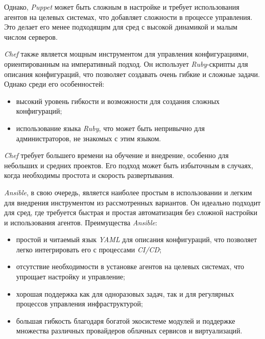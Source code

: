 Однако, \textit{Puppet} может быть сложным в настройке и требует использования агентов на целевых системах, что добавляет сложности в процессе управления. Это делает его менее подходящим для сред с высокой динамикой и малым числом серверов.


\textit{Chef} также является мощным инструментом для управления конфигурациями, ориентированным на императивный подход. Он использует \textit{Ruby}-скрипты для описания конфигураций, что позволяет создавать очень гибкие и сложные задачи. Однако среди его особенностей:
\begin{itemize}
    \item высокий уровень гибкости и возможности для создания сложных конфигураций;
    \item использование языка \textit{Ruby}, что может быть непривычно для администраторов, не знакомых с этим языком.
\end{itemize}

\textit{Chef} требует большего времени на обучение и внедрение, особенно для небольших и средних проектов. Его подход может быть избыточным в случаях, когда необходимы простота и скорость развертывания.


\textit{Ansible}, в свою очередь, является наиболее простым в использовании и легким для внедрения инструментом из рассмотренных вариантов. Он идеально подходит для сред, где требуется быстрая и простая автоматизация без сложной настройки и использования агентов. Преимущества \textit{Ansible}:
\begin{itemize}
    \item простой и читаемый язык \textit{YAML} для описания конфигураций, что позволяет легко интегрировать его с процессами \textit{CI/CD};
    \item отсутствие необходимости в установке агентов на целевых системах, что упрощает настройку и управление;
    \item хорошая поддержка как для одноразовых задач, так и для регулярных процессов управления инфраструктурой;
    \item большая гибкость благодаря богатой экосистеме модулей и поддержке множества различных провайдеров облачных сервисов и виртуализаций.
\end{itemize}

